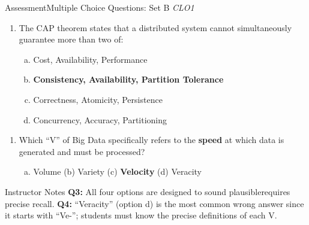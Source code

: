 \documentclass[aspectratio=169,10pt]{beamer}
\begin{document}
\begin{frame}{Assessment\textemdash Multiple Choice Questions: Set B \hfill\small\textit{CLO1}}
  \vspace{6pt}
  \begin{enumerate}[\textbf{Q3.}]
    \item The CAP theorem states that a distributed system cannot simultaneously guarantee more than two of:
    \begin{enumerate}[(a)]
      \item Cost, Availability, Performance
      \item \textbf{Consistency, Availability, Partition Tolerance}
      \item Correctness, Atomicity, Persistence
      \item Concurrency, Accuracy, Partitioning
    \end{enumerate}
  \end{enumerate}
  \vspace{8pt}
  \begin{enumerate}[\textbf{Q4.}]
    \item Which ``V'' of Big Data specifically refers to the \textbf{speed} at which data is generated and must be processed?
    \begin{enumerate}[(a)]
      \item Volume \quad
      (b) Variety \quad
      (c) \textbf{Velocity} \quad
      (d) Veracity
    \end{enumerate}
  \end{enumerate}
  \vspace{10pt}
  \begin{alertblock}{Instructor Notes}
    \textbf{Q3:} All four options are designed to sound plausible\textemdash requires precise recall.  \textbf{Q4:} ``Veracity'' (option d) is the most common wrong answer since it starts with ``Ve-''; students must know the precise definitions of each V.
  \end{alertblock}
\end{frame}
\end{document}
